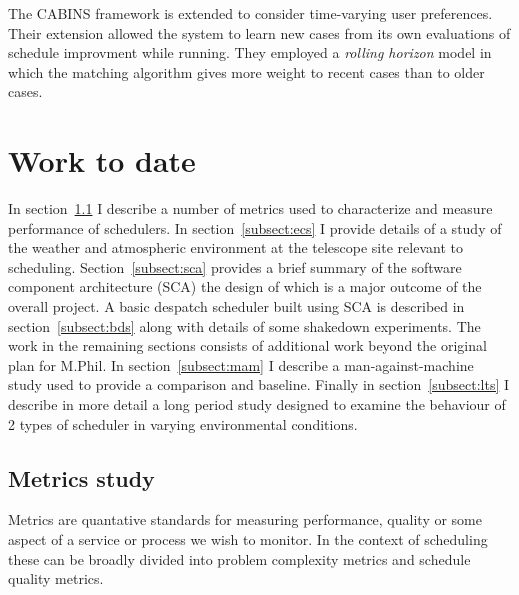 \documentclass[12pt,a4paper]{article}
\begin{document}
The CABINS framework is extended \citep{sycara96case} to consider time-varying user preferences. Their extension allowed the system to learn new cases from its own evaluations of schedule improvment while running. They employed a \emph{rolling horizon} model in which the matching algorithm gives more weight to recent cases than to older cases.


\newpage
\section{Work to date}

In section~\ref{subsect:metric} I describe a number of metrics used to characterize and measure performance of schedulers. In section~\ref{subsect:ecs} I provide details of a study of the weather and atmospheric environment at the telescope site relevant to scheduling. Section~\ref{subsect:sca} provides a brief summary of the software component architecture (SCA) the design of which is a major outcome of the overall project. A basic despatch scheduler built using SCA is described in section~\ref{subsect:bds} along with details of some shakedown experiments. The work in the remaining sections consists of additional work beyond the original plan for M.Phil. In section~\ref{subsect:mam} I describe a man-against-machine study used to provide a comparison and baseline. Finally in section~\ref{subsect:lts} I describe in more detail a long period study designed to examine the behaviour of 2 types of scheduler in varying environmental conditions.

\subsection{Metrics study}
\label{subsect:metric}
Metrics are quantative standards for measuring performance, quality or some aspect of a service or process we wish to monitor. In the context of scheduling these can be broadly divided into problem complexity metrics and schedule quality metrics.
\end{document}
